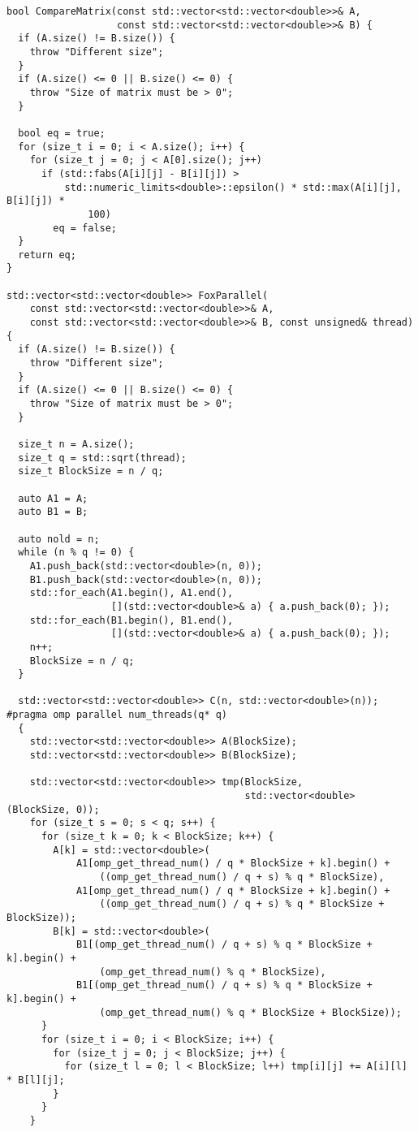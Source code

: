 \documentclass[12pt]{article}
\begin{document}
\begin{lstlisting}
bool CompareMatrix(const std::vector<std::vector<double>>& A,
                   const std::vector<std::vector<double>>& B) {
  if (A.size() != B.size()) {
    throw "Different size";
  }
  if (A.size() <= 0 || B.size() <= 0) {
    throw "Size of matrix must be > 0";
  }

  bool eq = true;
  for (size_t i = 0; i < A.size(); i++) {
    for (size_t j = 0; j < A[0].size(); j++)
      if (std::fabs(A[i][j] - B[i][j]) >
          std::numeric_limits<double>::epsilon() * std::max(A[i][j], B[i][j]) *
              100)
        eq = false;
  }
  return eq;
}

std::vector<std::vector<double>> FoxParallel(
    const std::vector<std::vector<double>>& A,
    const std::vector<std::vector<double>>& B, const unsigned& thread) {
  if (A.size() != B.size()) {
    throw "Different size";
  }
  if (A.size() <= 0 || B.size() <= 0) {
    throw "Size of matrix must be > 0";
  }

  size_t n = A.size();
  size_t q = std::sqrt(thread);
  size_t BlockSize = n / q;

  auto A1 = A;
  auto B1 = B;

  auto nold = n;
  while (n % q != 0) {
    A1.push_back(std::vector<double>(n, 0));
    B1.push_back(std::vector<double>(n, 0));
    std::for_each(A1.begin(), A1.end(),
                  [](std::vector<double>& a) { a.push_back(0); });
    std::for_each(B1.begin(), B1.end(),
                  [](std::vector<double>& a) { a.push_back(0); });
    n++;
    BlockSize = n / q;
  }

  std::vector<std::vector<double>> C(n, std::vector<double>(n));
#pragma omp parallel num_threads(q* q)
  {
    std::vector<std::vector<double>> A(BlockSize);
    std::vector<std::vector<double>> B(BlockSize);

    std::vector<std::vector<double>> tmp(BlockSize,
                                         std::vector<double>(BlockSize, 0));
    for (size_t s = 0; s < q; s++) {
      for (size_t k = 0; k < BlockSize; k++) {
        A[k] = std::vector<double>(
            A1[omp_get_thread_num() / q * BlockSize + k].begin() +
                ((omp_get_thread_num() / q + s) % q * BlockSize),
            A1[omp_get_thread_num() / q * BlockSize + k].begin() +
                ((omp_get_thread_num() / q + s) % q * BlockSize + BlockSize));
        B[k] = std::vector<double>(
            B1[(omp_get_thread_num() / q + s) % q * BlockSize + k].begin() +
                (omp_get_thread_num() % q * BlockSize),
            B1[(omp_get_thread_num() / q + s) % q * BlockSize + k].begin() +
                (omp_get_thread_num() % q * BlockSize + BlockSize));
      }
      for (size_t i = 0; i < BlockSize; i++) {
        for (size_t j = 0; j < BlockSize; j++) {
          for (size_t l = 0; l < BlockSize; l++) tmp[i][j] += A[i][l] * B[l][j];
        }
      }
    }


\end{lstlisting}
\end{document}
